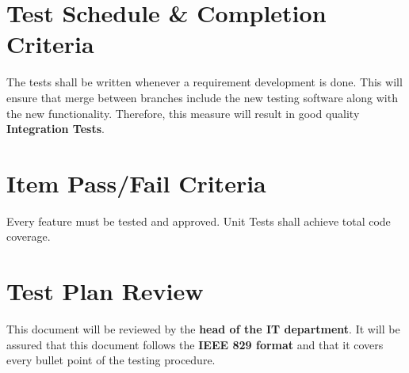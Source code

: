 \documentclass[12pt]{article}
\begin{document}
\section*{Test Schedule \& Completion Criteria}

The tests shall be written whenever a requirement development is done. This will ensure that merge between branches include the new testing software along with the new functionality. Therefore, this measure will result in good quality \textbf{Integration Tests}.

\section*{Item Pass/Fail Criteria}

\par Every feature must be tested and approved. Unit Tests shall achieve total code coverage.

\section*{Test Plan Review}

This document will be reviewed by the \textbf{head of the IT department}. It will be assured that this document follows the \textbf{IEEE 829 format} and that it covers every bullet point of the testing procedure.
\end{document}
